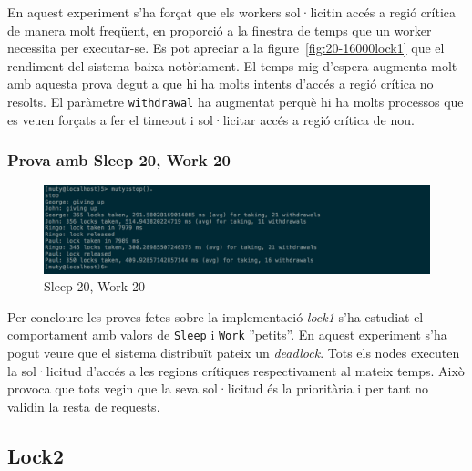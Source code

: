 \documentclass[a4paper, 11pt]{article}
\begin{document}
En aquest experiment s'ha forçat que els workers sol·licitin accés a regió
crítica de manera molt freqüent, en proporció a la finestra de temps que un
worker necessita per executar-se.  
Es pot apreciar a la figure~\ref{fig:20-16000lock1} que el rendiment del sistema
baixa notòriament. El temps mig d'espera augmenta molt amb aquesta prova degut a
que hi ha molts intents d'accés a regió crítica no resolts. El paràmetre
\texttt{withdrawal} ha augmentat perquè hi ha molts processos que es veuen
forçats a fer el timeout i sol·licitar accés a regió crítica de nou.

\subsubsection{Prova amb Sleep 20, Work 20}

\begin{figure}[H]
	\centering
    \includegraphics[width=1.0\textwidth]{figures/20-20lock1}
    \caption{Sleep 20, Work 20 \label{fig:20-20lock1}}    
\end{figure}

Per concloure les proves fetes sobre la implementació \textit{lock1} s'ha
estudiat el comportament amb valors de \texttt{Sleep} i \texttt{Work}
''petits''. En aquest experiment s'ha pogut veure que el sistema distribuït
pateix un \emph{deadlock}. Tots els nodes executen la sol·licitud d'accés a les regions
crítiques respectivament al mateix temps. Això provoca que tots vegin que la
seva sol·licitud és la prioritària i per tant no validin la resta de requests.

\subsection{Lock2}
\end{document}
